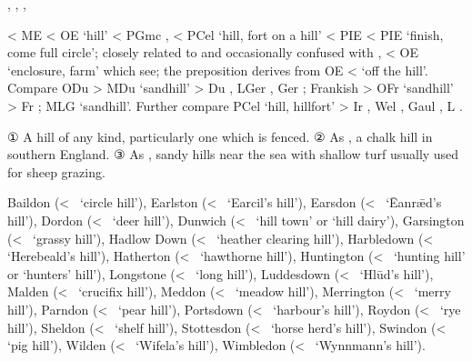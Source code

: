 \documentclass[12pt,letterpaper,oneside,article,draft]{memoir}
\begin{document}
\begin{Lemma}
\begin{Also}
	, , , 
\end{Also}
\begin{Etymology}
	< ME  < OE  ‘hill’ < PGmc , 
		< PCel  ‘hill, fort on a hill’
		< PIE  < PIE  ‘finish, come full circle’;
		closely related to and occasionally confused with , 
			< OE  ‘enclosure, farm’ which see;
		the preposition  derives from OE  <  ‘off the hill’.
	Compare
	ODu  > MDu  ‘sandhill’ > Du , LGer , Ger ;
	Frankish  > OFr  ‘sandhill’ > Fr ;
	MLG  ‘sandhill’.
	Further compare
	PCel  ‘hill, hillfort’ > Ir , Wel , Gaul , L .
\end{Etymology}
\begin{Definitions}
	① A hill of any kind, particularly one which is fenced.
	② As , a chalk hill in southern England.
	③ As , sandy hills near the sea with shallow turf usually used for sheep grazing.
\end{Definitions}
\begin{Examples}
	Baildon (<~ ‘circle hill’),
	Earlston (<~ ‘Earcil’s hill’),
	Earsdon (<~ ‘Ēanrǣd’s hill’),
	Dordon (<~ ‘deer hill’),
	Dunwich (<~ ‘hill town’ or ‘hill dairy’),
	Garsington (<~ ‘grassy hill’),
	Hadlow Down (<~ ‘heather clearing hill’),
	Harbledown (<~ ‘Herebeald’s hill’),
	Hatherton (<~ ‘hawthorne hill’),
	Huntington (<~ ‘hunting hill’ or  ‘hunters’ hill’),
	Longstone (<~ ‘long hill’),
	Luddesdown (<~ ‘Hlūd’s hill’),
	Malden (<~ ‘crucifix hill’),
	Meddon (<~ ‘meadow hill’),
	Merrington (<~ ‘merry hill’),
	Parndon (<~ ‘pear hill’),
	Portsdown (<~ ‘harbour’s hill’),
	Roydon (<~ ‘rye hill’),
	Sheldon (<~ ‘shelf hill’),
	Stottesdon (<~ ‘horse herd’s hill’),
	Swindon (<~ ‘pig hill’),
	Wilden (<~ ‘Wifela’s hill’),
	Wimbledon (<~ ‘Wynnmann’s hill’).
\end{Examples}
\end{Lemma}
\end{document}
